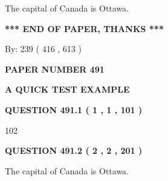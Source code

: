 \documentclass[12pt]{article}
\begin{document}
  
 
 
\noindent{}
 
 
The capital of Canada is Ottawa.
 
 
 
 
   
   
 \vspace{0.2in}
 
   
   
   
   
\vspace{1.0in} 
{\textbf{\large{ *** END OF PAPER, THANKS *** }}} 
   
   
\hspace{1.0in} By: 
 239 ( 416 ,  613 )
   
   
   
   
\newpage 
\setcounter{page}{ 
   491001 } 
   
   
   
   
 {\textbf{ \Large{ PAPER NUMBER  491  }}}
   
   
\vspace{0.2in}
   
   
   
   
   
   
 \vspace{0.2in}
{\LARGE {\textbf{ A QUICK TEST EXAMPLE}}}
   
   
  
\vspace{0.2in}
  
{\textbf{\Large{QUESTION
491.1 
 ( 1 , 1 , 101 )
}}}
  
  
 
 
\noindent{}

102
 
 
  
\vspace{0.2in}
  
{\textbf{\Large{QUESTION
491.2 
 ( 2 , 2 , 201 )
}}}
  
  
 
 
\noindent{}
 
 
The capital of Canada is Ottawa.
 
\end{document}
